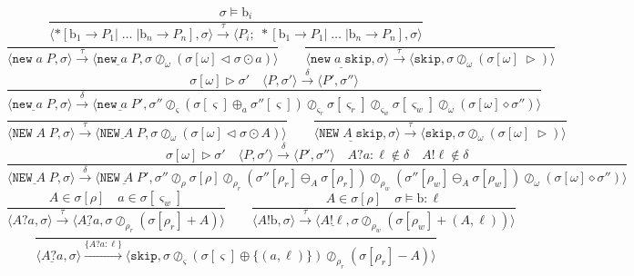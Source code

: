 \documentclass[times,10pt]{article}
\begin{document}
$$    \frac{\sigma \models \textrm{b}_i} {\langle *[ \mathrm{b}_1 \rightarrow P_1  | \; \ldots \; | \mathrm{b}_n \rightarrow P_n ] , \sigma \rangle \xrightarrow{\tau} \langle P_i;\;*[ \mathrm{b}_1 \rightarrow P_1  | \; \ldots \; | \mathrm{b}_n \rightarrow P_n ] , \sigma\rangle  } $$$$
    \frac{}{\langle \mathtt{new} \; a \; P, \sigma \rangle \xrightarrow{\tau} \langle \underline{\mathtt{new} \; a \; P}, \sigma \oslash_\omega (\sigma[\omega] \triangleleft \sigma \odot a) \rangle} \qquad
    \frac{}{\langle \underline{\mathtt{new} \; a \; \mathtt{skip}}, \sigma \rangle \xrightarrow{\tau} \langle \mathtt{skip}, \sigma \oslash_\omega (\sigma[\omega] \; \triangleright) \rangle} $$$$
    \frac{\sigma[\omega] \triangleright \sigma' \quad \langle P, \sigma' \rangle \xrightarrow{\delta} \langle P', \sigma'' \rangle}{\langle \underline{\mathtt{new} \; a \; P}, \sigma \rangle \xrightarrow{\delta} \langle \underline{\mathtt{new} \; a \; P'}, \sigma'' \oslash_\varsigma (\sigma[\varsigma] \oplus_a \sigma''[\varsigma]) \oslash_{\varsigma_r} \sigma[\varsigma_r] \oslash_{\varsigma_w} \sigma[\varsigma_w] \oslash_\omega (\sigma[\omega] \diamond \sigma'') \rangle} $$$$
    \frac{}{\langle \mathtt{NEW} \; A \; P, \sigma \rangle \xrightarrow{\tau} \langle \underline{\mathtt{NEW} \; A \; P}, \sigma \oslash_\omega (\sigma[\omega] \triangleleft \sigma \odot A) \rangle} \qquad
    \frac{}{\langle \underline{\mathtt{NEW} \; A \; \mathtt{skip}}, \sigma \rangle \xrightarrow{\tau} \langle \mathtt{skip}, \sigma \oslash_\omega (\sigma[\omega] \; \triangleright) \rangle} $$$$
    \frac{\sigma[\omega] \triangleright \sigma' \quad \langle P, \sigma' \rangle \xrightarrow{\delta} \langle P', \sigma'' \rangle \quad A?a : \ell \notin \delta \quad A!\ell \notin \delta}{\langle \underline{\mathtt{NEW} \; A \; P}, \sigma \rangle \xrightarrow{\delta} \langle \underline{\mathtt{NEW} \; A \; P'}, \sigma'' \oslash_\rho \sigma[\rho] \oslash_{\rho_r} (\sigma''[\rho_r] \ominus_A \sigma[\rho_r]) \oslash_{\rho_w} (\sigma''[\rho_w] \ominus_A \sigma[\rho_w]) \oslash_\omega (\sigma[\omega] \diamond \sigma'') \rangle} $$$$
    \frac{A \in \sigma[\rho] \quad a \in \sigma[\varsigma_w]}{\langle A?a, \sigma \rangle \xrightarrow{\tau} \langle \underline{A?a}, \sigma \oslash_{\rho_r} (\sigma[\rho_r] + A) \rangle} \qquad
    \frac{A \in \sigma[\rho] \quad \sigma \models \mathrm{b} : \ell}{\langle A!\mathrm{b}, \sigma \rangle \xrightarrow{\tau} \langle \underline{A!\ell}, \sigma \oslash_{\rho_w} (\sigma[\rho_w] + (A, \ell)) \rangle} $$$$
    \frac{}{\langle \underline{A?a}, \sigma \rangle \xrightarrow{\{A?a : \ell\}} \langle \mathtt{skip}, \sigma \oslash_\varsigma (\sigma[\varsigma] \oplus \{(a, \ell)\}) \oslash_{\rho_r} (\sigma[\rho_r] - A) \rangle} $$$$
$$
\end{document}
